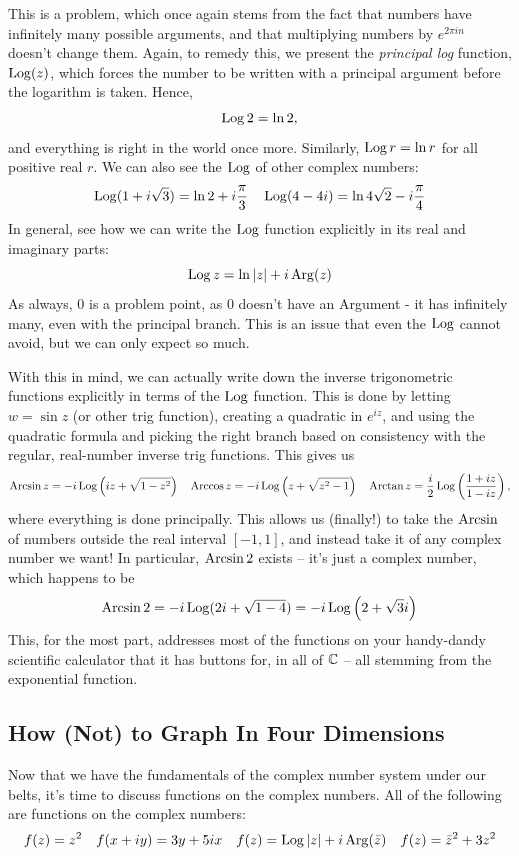 This is a problem, which once again stems from the fact that numbers have infinitely many possible arguments, and that multiplying numbers by $e^{2\pi i n}$ doesn't change them. Again, to remedy this, we present the \textit{principal log} function, $\operatorname*{Log} (z)$, which forces the number to be written with a principal argument before the logarithm is taken. Hence,
\[
    \operatorname*{Log} 2 = \ln 2,
\]
and everything is right in the world once more. Similarly, $\operatorname*{Log} r = \ln r$ for all positive real $r$. We can also see the $\operatorname*{Log}$ of other complex numbers:
\[
    \operatorname*{Log} (1 + i \sqrt{3}) = \ln 2 + i \frac{\pi}{3} \quad \operatorname*{Log}(4  - 4i) = \ln 4 \sqrt{2} - i \frac{\pi}{4}
\]
In general, see how we can write the $\operatorname*{Log}$ function explicitly in its real and imaginary parts:
\[
    \operatorname*{Log} z = \ln |z| + i \operatorname*{Arg}(z)
\]
As always, 0 is a problem point, as 0 doesn't have an Argument - it has infinitely many, even with the principal branch. This is an issue that even the $\operatorname*{Log}$ cannot avoid, but we can only expect so much.

With this in mind, we can actually write down the inverse trigonometric functions explicitly in terms of the $\operatorname*{Log}$ function. This is done by letting $w = \sin z$ (or other trig function), creating a quadratic in $e^{iz}$, and using the quadratic formula and picking the right branch based on consistency with the regular, real-number inverse trig functions. This gives us
\[
    \operatorname{Arcsin} z = -i \operatorname*{Log}\left(iz + \sqrt{1-z^2}\right) \quad \operatorname{Arccos} z = -i \operatorname*{Log}\left(z + \sqrt{z^2 -1}\right) \quad \operatorname{Arctan} z = \frac{i}{2} \operatorname*{Log}\left( \frac{1+iz}{1-iz}\right),
\]
where everything is done principally. This allows us (finally!) to take the $\operatorname{Arcsin}$ of numbers outside the real interval $[-1, 1]$, and instead take it of any complex number we want! In particular, $\operatorname{Arcsin} 2$ exists -- it's just a complex number, which happens to be
\[
    \operatorname{Arcsin} 2 = -i \operatorname*{Log}(2i + \sqrt{1-4}) = -i \operatorname*{Log}\left(2+\sqrt{3}i\right)
\]
This, for the most part, addresses most of the functions on your handy-dandy scientific calculator that it has buttons for, in all of $\mathbb C$ -- all stemming from the exponential function.

\subsection{How (Not) to Graph In Four Dimensions}
Now that we have the fundamentals of the complex number system under our belts, it's time to discuss functions on the complex numbers. All of the following are functions on the complex numbers:
\[
    f(z) = z^2 \quad f(x+iy) = 3y + 5ix \quad f(z) = \operatorname*{Log} |z| + i \operatorname*{Arg}(\bar{z}) \quad f(z) = \bar{z}^2 + 3z^2
\]

